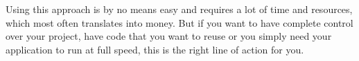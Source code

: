 Using this approach is by no means easy and requires a lot of time and resources, which most often translates into money. But if you want to have complete control over your project, have code that you want to reuse or you simply need your application to run at full speed, this is the right line of action for you.
